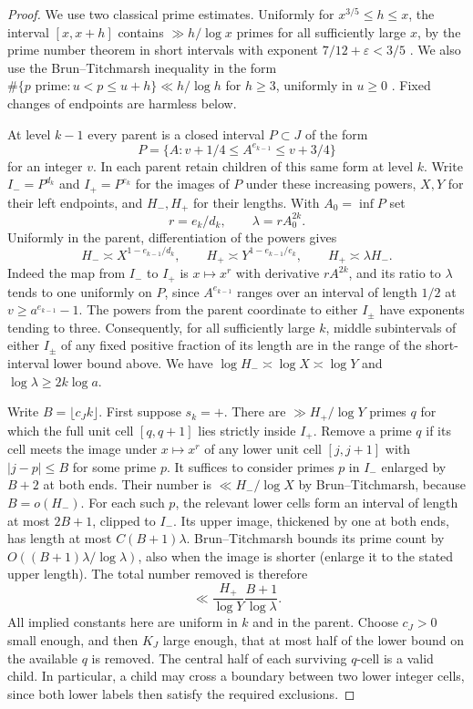 \documentclass[11pt]{article}
\theoremstyle{remark}\newtheorem*{remark}{Remark}
\begin{document}
\begin{proof}
We use two classical prime estimates. Uniformly for $x^{3/5}\le h\le x$,
the interval $[x,x+h]$ contains $\gg h/\log x$ primes for all sufficiently
large $x$, by the prime number theorem in short intervals with exponent
$7/12+\varepsilon<3/5$ \cite{tz}. We also use the Brun--Titchmarsh inequality
in the form $\#\{p\text{ prime}:u<p\le u+h\}\ll h/\log h$ for $h\ge3$,
uniformly in $u\ge0$ \cite{mv}. Fixed changes of endpoints are harmless below.

At level $k-1$ every parent is a closed interval $P\subset J$ of the form
\[
 P=\{A:v+1/4\le A^{e_{k-1}}\le v+3/4\}
\]
for an integer $v$. In each parent retain children of this same form at
level $k$. Write $I_-=P^{d_k}$ and $I_+=P^{e_k}$ for the images of
$P$ under these increasing powers, $X,Y$ for their left endpoints,
and $H_-,H_+$ for their lengths. With $A_0=\inf P$ set
\[
 r=e_k/d_k,\qquad \lambda=r A_0^{2k}.
\]
Uniformly in the parent, differentiation of the powers gives
\[
 H_-\asymp X^{1-e_{k-1}/d_k},\qquad
 H_+\asymp Y^{1-e_{k-1}/e_k},\qquad H_+\asymp\lambda H_-.
\]
Indeed the map from $I_-$ to $I_+$ is $x\mapsto x^r$ with derivative
$rA^{2k}$, and its ratio to $\lambda$ tends to one uniformly on $P$,
since $A^{e_{k-1}}$ ranges over an interval of length $1/2$ at
$v\ge a^{e_{k-1}}-1$. The powers from the parent coordinate to
either $I_\pm$ have exponents tending to three. Consequently, for
all sufficiently large $k$, middle subintervals of either $I_\pm$
of any fixed positive fraction of its length are in the range of
the short-interval lower bound above. We have
$\log H_-\asymp\log X\asymp\log Y$ and
$\log\lambda\ge 2k\log a$.

Write $B=\lfloor c_J k\rfloor$. First suppose $s_k=+$. There are
$\gg H_+/\log Y$ primes $q$ for which the full unit cell $[q,q+1]$
lies strictly inside $I_+$. Remove a prime $q$ if its cell meets
the image under $x\mapsto x^r$ of any lower unit cell $[j,j+1]$
with $|j-p|\le B$ for some prime $p$. It suffices to consider primes
$p$ in $I_-$ enlarged by $B+2$ at both ends. Their number is
$\ll H_-/\log X$ by Brun--Titchmarsh, because $B=o(H_-)$.
For each such $p$, the relevant lower cells form an interval of
length at most $2B+1$, clipped to $I_-$. Its upper image, thickened
by one at both ends, has length at most $C(B+1)\lambda$.
Brun--Titchmarsh bounds its prime count by
$O((B+1)\lambda/\log\lambda)$, also when the image is shorter
(enlarge it to the stated upper length). The total number removed is
therefore
\[
 \ll \frac{H_+}{\log Y}\frac{B+1}{\log\lambda}.
\]
All implied constants here are uniform in $k$ and in the parent.
Choose $c_J>0$ small enough, and then $K_J$ large enough, that
at most half of the lower bound on the available $q$ is removed.
The central half of each surviving $q$-cell is a valid child. In
particular, a child may cross a boundary between two lower integer
cells, since both lower labels then satisfy the required exclusions.


\end{proof}
\end{document}
